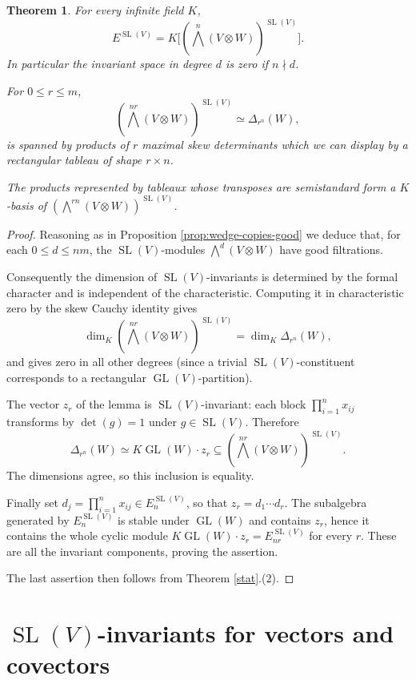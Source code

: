 \documentclass[10pt]{amsart}
\newtheorem{theorem}{Theorem}[section]
\theoremstyle{definition}
\theoremstyle{remark}
\newcommand{\GL}{\operatorname{GL}}
\newcommand{\SL}{\operatorname{SL}}
\begin{document}
\begin{theorem}\label{vetinve}
For every infinite field $K$,
\[
 \quad E^{\SL(V)}
 =K\big[(\bigwedge^n(V\otimes W))^{\SL(V)}\big].\quad
\]
In particular the invariant space in degree $d$ is zero if $n\nmid d$.\smallskip

For $0\le r\le m$,
\[
 (\bigwedge^{nr}(V\otimes W))^{\SL(V)}
 \simeq  \Delta_{r^n}(W),
\]
is spanned by products of $r$ maximal skew determinants which we  can   display by a rectangular tableau of shape $r\times n$. 

The products represented by tableaux whose transposes are semistandard form a $K$-basis of $(\bigwedge^{rn}(V\otimes W))^{\SL(V)}$.
\end{theorem}
\begin{proof}
Reasoning as  in Proposition \ref{prop:wedge-copies-good} we  deduce that, for each \(0\leq d\leq nm\),
the  $\SL(V)$-modules \(\bigwedge^d(V\otimes W)\) have good filtrations.


Consequently the dimension of $\SL(V)$-invariants is determined by the
formal character and is independent of the characteristic. Computing it
in characteristic zero by the skew Cauchy identity gives
\[
 \dim_K(\bigwedge^{nr}(V\otimes W))^{\SL(V)}
 =\dim_K  \Delta_{r^n}(W),
\]
and gives zero in all other degrees (since a trivial $\SL(V)$-constituent corresponds to a rectangular $\GL(V)$-partition).

The vector $z_r$ of the lemma is $\SL(V)$-invariant: each block
$\prod_{i=1}^{n}x_{ij}$ transforms by $\det(g)=1$ under
$g\in\SL(V)$. Therefore
\[
   \Delta_{r^n}(W)\simeq K\GL(W)\cdot z_r
 \subseteq (\bigwedge^{nr}(V\otimes W))^{\SL(V)}.
\]
The dimensions agree, so this inclusion is equality.

Finally set $d_j=\prod_{i=1}^{n}x_{ij}\in E_n^{\SL(V)}$, so that 
  $z_r=d_1\cdots d_r$. The subalgebra generated by $E_n^{\SL(V)}$
is stable under $\GL(W)$ and contains $z_r$, hence it contains the
whole cyclic module $K\GL(W)\cdot z_r=E_{nr}^{\SL(V)}$ for every $r$.
These are all the invariant components, proving the assertion.

The last assertion then  follows from Theorem \ref{stat}.(2).
\end{proof}
 

\section{$\SL(V)$-invariants for vectors and covectors}
\label{sec:slmixed-11nov}
\end{document}
